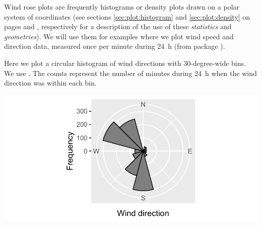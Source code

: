 \documentclass[krantz2]{krantz}\usepackage{knitr}
\begin{document}
Wind rose plots are frequently histograms or density plots drawn on a polar system of coordinates (see sections \ref{sec:plot:histogram} and \ref{sec:plot:density} on pages \pageref{sec:plot:histogram} and \pageref{sec:plot:density}, respectively for a description of the use of these \emph{statistics} and \emph{geometries}). We will use them for examples where we plot wind speed and direction data, measured once per minute during 24~h (from package ).

Here we plot a circular histogram of wind directions with 30-degree-wide bins. We use . The counts represent the number of minutes during 24~h when the wind direction was within each bin.

\begin{knitrout}\footnotesize
{}\color{fgcolor}\begin{kframe}
\begin{alltt}
 \hlkwb{<-}    \hlopt{+}
  \hlstd{()} \hlopt{+}
  \hlstd{(} \hlstd{=} \hlstd{(}\hlstd{,} \hlstd{,} \hlstd{,} \hlstd{),}
                      \hlstd{=} \hlstd{(}\hlstd{,} \hlstd{,} \hlstd{,} \hlstd{),}
                      \hlstd{=} \hlstd{(}\hlstd{,} \hlstd{),}
                      \hlstd{=} \hlstd{(}\hlstd{,} \hlstd{),}
                      \hlstd{=} \hlstd{)}
 \hlopt{+} \hlstd{(} \hlstd{=} \hlstd{,}  \hlstd{=} \hlstd{,}  \hlstd{=} \hlstd{,}
              \hlstd{=} \hlstd{,}  \hlstd{=} \hlstd{)} \hlopt{+} \hlstd{(} \hlstd{=} \hlstd{)}
\end{alltt}
\end{kframe}

{\centering \includegraphics[width=.7\textwidth]{figure/pos-wind-05-1}

}



\end{knitrout}
\end{document}
